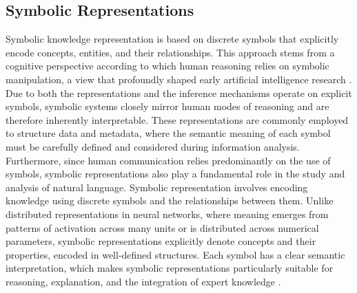 \documentclass[12pt,a4paper]{report}
\begin{document}
\subsection{Symbolic Representations}
Symbolic knowledge representation is based on discrete symbols that explicitly encode concepts, entities, and their relationships. This approach stems from a cognitive perspective according to which human reasoning relies on symbolic manipulation, a view that profoundly shaped early artificial intelligence research \cite{chiave64}. Due to both the representations and the inference mechanisms operate on explicit symbols, symbolic systems closely mirror human modes of reasoning and are therefore inherently interpretable. These representations are commonly employed to structure data and metadata, where the semantic meaning of each symbol must be carefully defined and considered during information analysis.
Furthermore, since human communication relies predominantly on the use of symbols, symbolic representations also play a fundamental role in the study and analysis of natural language.
Symbolic representation involves encoding knowledge using discrete symbols and the relationships between them. Unlike distributed representations in neural networks, where meaning emerges from patterns of activation across many units or is distributed across numerical parameters, symbolic representations explicitly denote concepts and their properties, encoded in well-defined structures. Each symbol has a clear semantic interpretation, which makes symbolic representations particularly suitable for reasoning, explanation, and the integration of expert knowledge \cite{chiave65}. 
\end{document}
